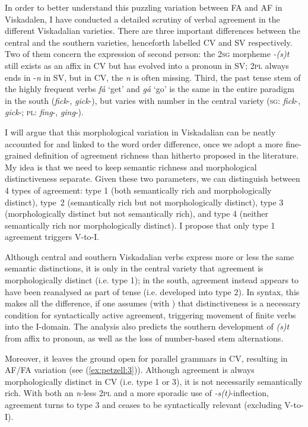 \documentclass[output=paper,colorlinks,citecolor=brown,draft,draftmode]{langscibook}
\begin{document}
In order to better understand this puzzling variation between FA and AF in Viskadalen, I have conducted a detailed scrutiny of verbal agreement in the different Viskadalian varieties. There are three important differences between the central and the southern varieties, henceforth labelled CV and SV respectively. Two of them concern the expression of second person: the 2\textsc{sg} morpheme \textit{-(s)t} still exists as an affix in CV but has evolved into a pronoun in SV; 2\textsc{pl} always ends in -\textit{n} in SV, but in CV, the \textit{n} is often missing. Third, the past tense stem of the highly frequent verbs \textit{få} ‘get’ and \textit{gå} ‘go’ is the same in the entire paradigm in the south (\textit{fick}-, \textit{gick}-), but varies with number in the central variety (\textsc{sg}: \textit{fick}-, \textit{gick}-; \textsc{pl}: \textit{fing}-, \textit{ging}-).



I will argue that this morphological variation in Viskadalian can be neatly accounted for and linked to the word order difference, once we adopt a more fine-grained definition of agreement richness than hitherto proposed in the literature. My idea is that we need to keep semantic richness and morphological distinctiveness separate. Given these two parameters, we can distinguish between 4 types of agreement: type 1 (both semantically rich and morphologically distinct), type~2 (semantically rich but not morphologically distinct), type 3 (morphologically distinct but not semantically rich), and type 4 (neither semantically rich nor morphologically distinct). I propose that only type 1 agreement triggers V-to-I.



Although central and southern Viskadalian verbs express more or less the same semantic distinctions, it is only in the central variety that agreement is morphologically distinct (i.e. type 1); in the south, agreement instead appears to have been reanalysed as part of tense (i.e. developed into type 2). In syntax, this makes all the difference, if one assumes (with \citealt{BobaljikThrainsson1998}) that distinctiveness is a necessary condition for syntactically active agreement, triggering movement of finite verbs into the I-domain. The analysis also predicts the southern development of \textit{(s)t} from affix to pronoun, as well as the loss of number-based stem alternations. 



Moreover, it leaves the ground open for parallel grammars in CV, resulting in AF/FA variation (see (\ref{ex:petzell:3})). Although agreement is always morphologically distinct in CV (i.e. type 1 or 3), it is not necessarily semantically rich. With both an \textit{n-}less 2\textsc{pl} and a more sporadic use of \textit{-s(t)}-inflection, agreement turns to type 3 and ceases to be syntactically relevant (excluding V-to-I).
\end{document}
